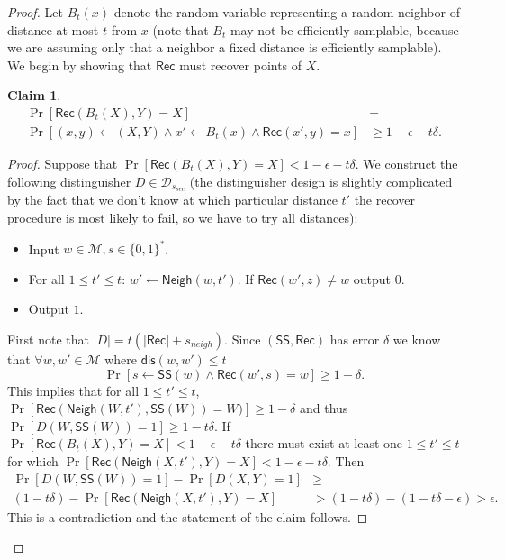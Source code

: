 \documentclass[11pt]{article}
\newcommand{\class}[1]{{\ensuremath{\mathsf{#1}}}}
\newcommand{\sketch}{\ensuremath{\class{SS}}\xspace}
\newcommand{\rec}{\ensuremath{\class{Rec}}\xspace}
\newcommand{\zo}{\ensuremath{\{0, 1\}}}
\newcommand{\neigh}{\ensuremath{\class{Neigh}}\xspace}
\newcommand{\dis}{\ensuremath{\mathsf{dis}}}
\newtheorem{claim}[theorem]{Claim}
\begin{document}
\begin{proof}
Let $B_t(x)$ denote the random variable representing a random neighbor of distance at most $t$ from $x$ (note that $B_t$ may not be efficiently samplable, because we are assuming only that a neighbor a fixed distance is efficiently samplable).
We begin by showing that \rec must recover points of $X$.  
\begin{claim}
\label{clm:y is recoverable}
\begin{align*}
\Pr[\rec(B_t(X), Y) = X]&=\\
\Pr[(x, y)\leftarrow (X, Y) \wedge x'\leftarrow B_t(x) \wedge \rec(x', y) = x] &\geq 1-\epsilon -t\delta.
\end{align*}
\end{claim}
\begin{proof}
Suppose that $\Pr[\rec(B_t(X), Y) = X]<1-\epsilon -t\delta$.  We construct the following distinguisher $D\in\mathcal{D}_{s_{sec}}$ (the distinguisher design is slightly complicated by the fact that we don't know at which particular distance $t'$ the recover procedure is most likely to fail, so we have to try all distances):
\begin{itemize}
\item Input $w\in \mathcal{M}, s\in\zo^*$.
\item For all $1\leq t'\leq t$: 
\subitem  $w'\leftarrow \neigh(w, t')$.
\subitem If $\rec(w', z) \neq  w$ output $0$.
\item Output $1$.
\end{itemize}
First note that $|D| = t( |\rec|+ s_{neigh} )$.  Since $(\sketch, \rec)$ has error $\delta$ we know that $\forall w, w'\in \mathcal{M}$ where $\dis(w, w')\leq t$ \[ \Pr[s\leftarrow \sketch(w) \wedge \rec(w', s) =  w] \geq 1-\delta.\]  This implies that for all $1\leq t'\leq t$, $\Pr[\rec(\neigh(W, t'), \sketch(W) )= W)  ]\geq 1-\delta$ and thus $\Pr[D(W, \sketch(W)) = 1]\geq 1-t\delta$.  If $\Pr[\rec(B_t(X), Y) = X] < 1-\epsilon -t\delta$ there must exist at least one $1\leq t'\leq t$ for which $\Pr[\rec(\neigh(X, t'), Y) = X] < 1-\epsilon -t\delta$.  Then 
\begin{align*}
\Pr[D(W, \sketch(W)) = 1]  - \Pr[D(X, Y)=1] &\geq\\
(1-t\delta) - \Pr[\rec(\neigh(X, t'), Y) = X] &> (1-t\delta)-(1-t\delta - \epsilon)>\epsilon.
\end{align*}
This is a contradiction and the statement of the claim follows.
\end{proof}


\end{proof}
\end{document}
